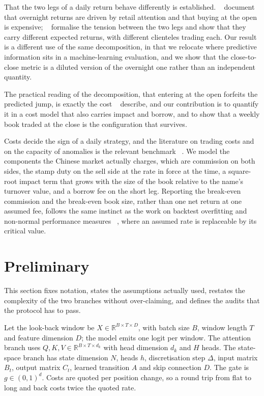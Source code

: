 \documentclass[pdflatex,sn-mathphys-ay]{sn-jnl}
\theoremstyle{thmstyleone}%
\theoremstyle{thmstyletwo}%
\theoremstyle{thmstyletwo}%
\begin{document}
That the two legs of a daily return behave differently is established. ~\citet{berkman2012paying}
document that overnight returns are driven by retail attention and that buying at the open is
expensive; ~\citet{lou2019tug} formalise the tension between the two legs and show that they carry
different expected returns, with different clienteles trading each. Our result is a different use of
the same decomposition, in that we relocate where predictive information sits in a machine-learning
evaluation, and we show that the close-to-close metric is a diluted version of the overnight one
rather than an independent quantity.

The practical reading of the decomposition, that entering at the open forfeits the predicted jump,
is exactly the cost ~\citet{berkman2012paying} describe, and our contribution is to quantify it in
a cost model that also carries impact and borrow, and to show that a weekly book traded at the close is
the configuration that survives.


Costs decide the sign of a daily strategy, and the literature on trading costs and on the capacity of
anomalies is the relevant benchmark ~\citep{frazzini2018trading}. We model the components the Chinese
market actually charges, which are commission on both sides, the stamp duty on the sell side at the
rate in force at the time, a square-root impact term that grows with the size of the book relative to
the name's turnover value, and a borrow fee on the short leg. Reporting the break-even commission and
the break-even book size, rather than one net return at one assumed fee, follows the same instinct as
the work on backtest overfitting and non-normal performance measures ~\citep{bailey2014deflated},
where an assumed rate is replaceable by its critical value.

\section{Preliminary}\label{sec3}

This section fixes notation, states the assumptions actually used, restates the complexity of the
two branches without over-claiming, and defines the audits that the protocol has to pass.

Let the look-back window be $X \in \mathbb{R}^{B \times T \times D}$, with batch size $B$, window
length $T$ and feature dimension $D$; the model emits one logit per window. The attention branch
uses $Q,K,V \in \mathbb{R}^{B \times T \times d_k}$ with head dimension $d_k$ and $H$ heads. The
state-space branch has state dimension $N$, heads $h$, discretisation step $\Delta$, input matrix
$B_t$, output matrix $C_t$, learned transition $A$ and skip connection $D$. The gate is
$g \in (0,1)^{d}$. Costs are quoted per position change, so a round trip from flat to long and back
costs twice the quoted rate.
\end{document}
